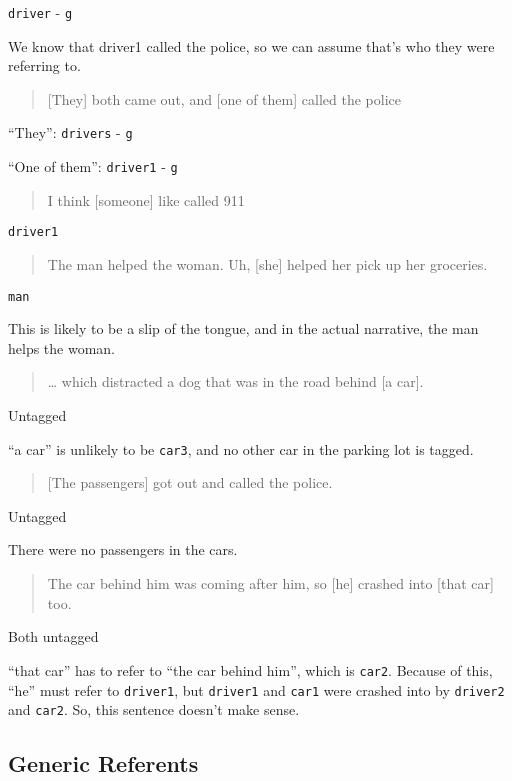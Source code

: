 \documentclass[
]{book}
\begin{document}
\texttt{driver} - \texttt{g}

We know that driver1 called the police,
so we can assume that's who they were referring to.

\begin{quote}
{[}They{]} both came out, and {[}one of them{]} called the police
\end{quote}

``They'': \texttt{drivers} - \texttt{g}

``One of them'': \texttt{driver1} - \texttt{g}

\begin{quote}
I think {[}someone{]} like called 911
\end{quote}

\texttt{driver1}

\begin{quote}
The man helped the woman. Uh, {[}she{]} helped her pick up her groceries.
\end{quote}

\texttt{man}

This is likely to be a slip of the tongue,
and in the actual narrative, the man helps the woman.

\begin{quote}
\ldots{} which distracted a dog that was in the road behind {[}a car{]}.
\end{quote}

Untagged

``a car'' is unlikely to be \texttt{car3},
and no other car in the parking lot is tagged.

\begin{quote}
{[}The passengers{]} got out and called the police.
\end{quote}

Untagged

There were no passengers in the cars.

\begin{quote}
The car behind him was coming after him,
so {[}he{]} crashed into {[}that car{]} too.
\end{quote}

Both untagged

``that car'' has to refer to ``the car behind him'', which is \texttt{car2}.
Because of this, ``he'' must refer to \texttt{driver1},
but \texttt{driver1} and \texttt{car1} were crashed into by \texttt{driver2} and \texttt{car2}.
So, this sentence doesn't make sense.

\hypertarget{generic-referents}{%
\subsection{Generic Referents}\label{generic-referents}}
\end{document}
